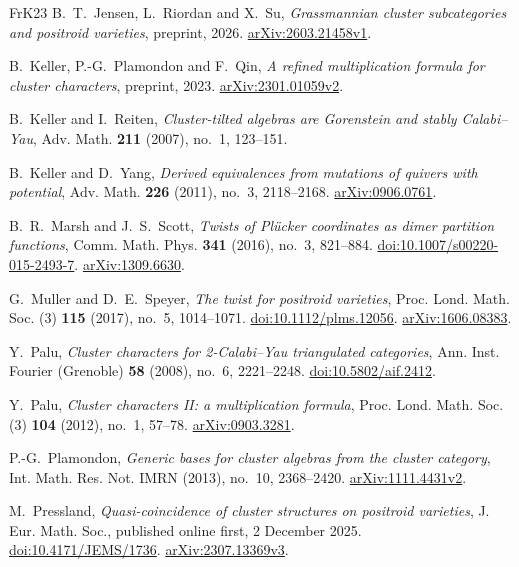 \documentclass[11pt]{amsart}
\numberwithin{equation}{section}
\theoremstyle{definition}
\theoremstyle{remark}
\begin{document}
\begin{thebibliography}{FrK23}
B.~T.~Jensen, L.~Riordan and X.~Su,
\emph{Grassmannian cluster subcategories and positroid varieties},
preprint, 2026.
\href{https://arxiv.org/abs/2603.21458v1}{arXiv:2603.21458v1}.

B.~Keller, P.-G.~Plamondon and F.~Qin,
\emph{A refined multiplication formula for cluster characters},
preprint, 2023.
\href{https://arxiv.org/abs/2301.01059v2}{arXiv:2301.01059v2}.

B.~Keller and I.~Reiten,
\emph{Cluster-tilted algebras are Gorenstein and stably Calabi--Yau},
Adv. Math. \textbf{211} (2007), no.~1, 123--151.

B.~Keller and D.~Yang,
\emph{Derived equivalences from mutations of quivers with potential},
Adv. Math. \textbf{226} (2011), no.~3, 2118--2168.
\href{https://arxiv.org/abs/0906.0761}{arXiv:0906.0761}.

B.~R.~Marsh and J.~S.~Scott,
\emph{Twists of Pl\"ucker coordinates as dimer partition functions},
Comm. Math. Phys. \textbf{341} (2016), no.~3, 821--884.
\href{https://doi.org/10.1007/s00220-015-2493-7}{doi:10.1007/s00220-015-2493-7}.
\href{https://arxiv.org/abs/1309.6630}{arXiv:1309.6630}.

G.~Muller and D.~E.~Speyer,
\emph{The twist for positroid varieties},
Proc. Lond. Math. Soc. (3) \textbf{115} (2017), no.~5, 1014--1071.
\href{https://doi.org/10.1112/plms.12056}{doi:10.1112/plms.12056}.
\href{https://arxiv.org/abs/1606.08383}{arXiv:1606.08383}.


Y.~Palu, \emph{Cluster characters for 2-Calabi--Yau triangulated categories},
Ann. Inst. Fourier (Grenoble) \textbf{58} (2008), no.~6, 2221--2248.
\href{https://doi.org/10.5802/aif.2412}{doi:10.5802/aif.2412}.

Y.~Palu, \emph{Cluster characters II: a multiplication formula},
Proc. Lond. Math. Soc. (3) \textbf{104} (2012), no.~1, 57--78.
\href{https://arxiv.org/abs/0903.3281}{arXiv:0903.3281}.

P.-G.~Plamondon, \emph{Generic bases for cluster algebras from the cluster category},
Int. Math. Res. Not. IMRN (2013), no.~10, 2368--2420.
\href{https://arxiv.org/abs/1111.4431v2}{arXiv:1111.4431v2}.

M.~Pressland, \emph{Quasi-coincidence of cluster structures on positroid varieties},
J. Eur. Math. Soc., published online first, 2 December 2025.
\href{https://doi.org/10.4171/JEMS/1736}{doi:10.4171/JEMS/1736}.
\href{https://arxiv.org/abs/2307.13369v3}{arXiv:2307.13369v3}.


\end{thebibliography}
\end{document}
